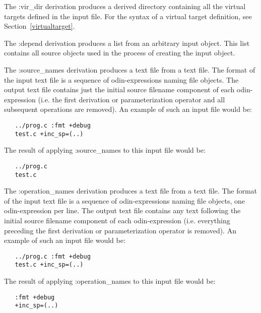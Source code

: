 The {\ex :vir\_dir} derivation produces a derived directory
containing all the virtual targets defined in the input file.
For the syntax of a virtual target definition,
see Section~\ref{virtualtarget}.

The {\ex :depend} derivation produces a list
from an arbitrary input object.
This list contains all source objects used in the process
of creating the input object.

The {\ex :source\_names} derivation produces a text file from a text file.
The format of the input text file is a sequence of odin-expressions
naming file objects.
The output text file contains just the initial source filename component
of each odin-expression (i.e. the first derivation or parameterization
operator and all subsequent operations are removed).
An example of such an input file would be:
\begin{verbatim}
   ../prog.c :fmt +debug
   test.c +inc_sp=(..)
\end{verbatim}
The result of applying {\ex :source\_names} to this input file would be:
\begin{verbatim}
   ../prog.c
   test.c
\end{verbatim}

The {\ex :operation\_names} derivation produces a text file from a text file.
The format of the input text file is a sequence of odin-expressions
naming file objects, one odin-expression per line.
The output text file contains any text following the initial source
filename component of each odin-expression (i.e. everything preceding
the first derivation or parameterization operator is removed).
An example of such an input file would be:
\begin{verbatim}
   ../prog.c :fmt +debug
   test.c +inc_sp=(..)
\end{verbatim}
The result of applying {\ex :operation\_names} to this input file would be:
\begin{verbatim}
   :fmt +debug
   +inc_sp=(..)
\end{verbatim}


